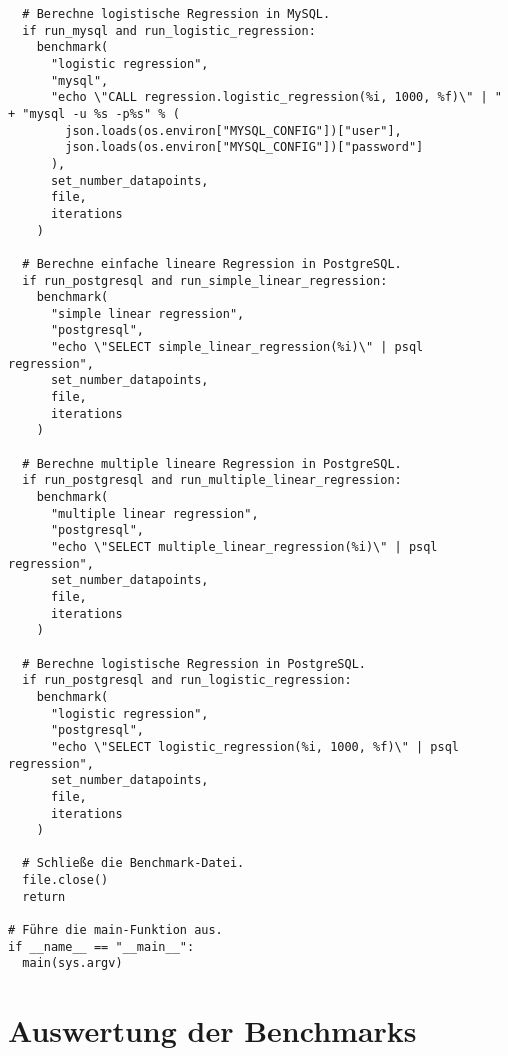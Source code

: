 \begin{verbatim}
  # Berechne logistische Regression in MySQL.
  if run_mysql and run_logistic_regression:
    benchmark(
      "logistic regression",
      "mysql",
      "echo \"CALL regression.logistic_regression(%i, 1000, %f)\" | " + "mysql -u %s -p%s" % (
        json.loads(os.environ["MYSQL_CONFIG"])["user"],
        json.loads(os.environ["MYSQL_CONFIG"])["password"]
      ),
      set_number_datapoints,
      file,
      iterations
    )

  # Berechne einfache lineare Regression in PostgreSQL.
  if run_postgresql and run_simple_linear_regression:
    benchmark(
      "simple linear regression",
      "postgresql",
      "echo \"SELECT simple_linear_regression(%i)\" | psql regression",
      set_number_datapoints,
      file,
      iterations
    )

  # Berechne multiple lineare Regression in PostgreSQL.
  if run_postgresql and run_multiple_linear_regression:
    benchmark(
      "multiple linear regression",
      "postgresql",
      "echo \"SELECT multiple_linear_regression(%i)\" | psql regression",
      set_number_datapoints,
      file,
      iterations
    )

  # Berechne logistische Regression in PostgreSQL.
  if run_postgresql and run_logistic_regression:
    benchmark(
      "logistic regression",
      "postgresql",
      "echo \"SELECT logistic_regression(%i, 1000, %f)\" | psql regression",
      set_number_datapoints,
      file,
      iterations
    )

  # Schließe die Benchmark-Datei.
  file.close()
  return

# Führe die main-Funktion aus.
if __name__ == "__main__":
  main(sys.argv)
\end{verbatim}

\section{Auswertung der Benchmarks}
\label{appendix:F:2}

